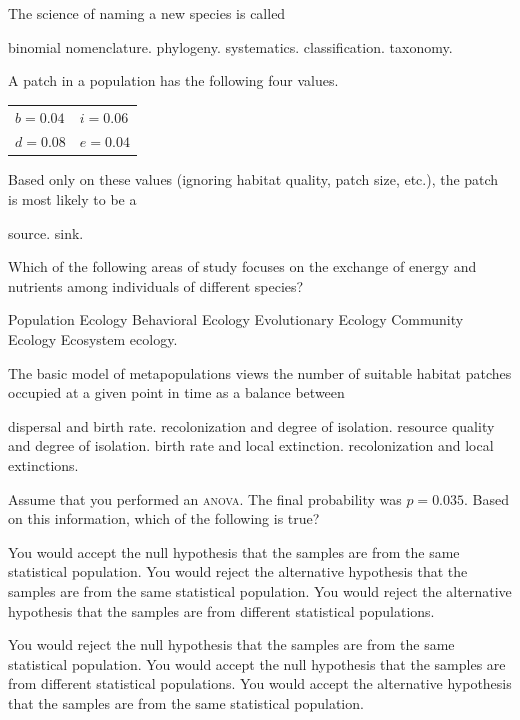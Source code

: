 
\question
The science of naming a new species is called

\begin{choices}
\choice binomial nomenclature. 
\choice phylogeny. 
\choice systematics. 
\choice classification. 
\correctchoice  taxonomy. 
\end{choices}

\question
A patch in a population has the following four values. 

\qquad\begin{tabular}{@{}ll@{}}
$b = 0.04$ & $i = 0.06$\\
$d = 0.08$ & $e = 0.04$\\
\end{tabular}

Based only on these values (ignoring habitat quality, patch size, etc.), the patch is most likely to be a 

\begin{choices}
\choice  source. 
\correctchoice  sink.
\end{choices}

\question
Which of the following areas of study focuses on the exchange of energy and nutrients among individuals of different species?

\begin{choices}
\choice Population Ecology 
\choice Behavioral Ecology 
\choice Evolutionary Ecology 
\choice Community Ecology 
\correctchoice Ecosystem ecology. 
\end{choices}

\question
The basic model of metapopulations views the number of suitable habitat patches occupied at a given point in time as a balance between

\begin{choices}
\choice dispersal and birth rate. 
\choice recolonization and degree of isolation. 
\choice resource quality and degree of isolation. 
\choice birth rate and local extinction. 
\correctchoice recolonization and local extinctions. 
\end{choices}

\question
Assume that you performed an \textsc{anova}. The final probability was $p = 0.035$. Based on this information, which of the following is true?

\begin{choices}
\choice You would accept the null hypothesis that the samples are from the same statistical population. 
\choice You would reject the alternative hypothesis that the samples are from the same statistical population. 
\choice You would reject the alternative hypothesis that the samples are from different statistical populations.
 
\correctchoice You would reject the null hypothesis that the samples are from the same statistical population. 
\choice You would accept the null hypothesis that the samples are from different statistical populations. 
\choice You would accept the alternative hypothesis that the samples are from the same statistical population. 
\end{choices}

